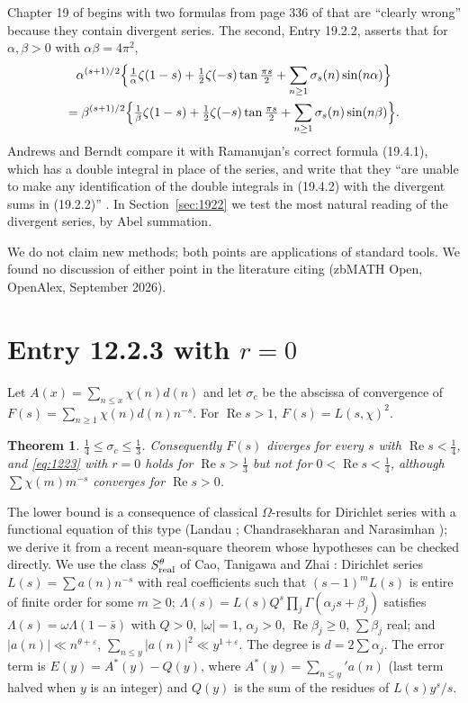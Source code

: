 \documentclass[11pt]{article}
\newtheorem{theorem}{Theorem}
\theoremstyle{remark}
\begin{document}
Chapter 19 of \cite{AB4} begins with two formulas from page 336 of \cite{LN} that are ``clearly wrong'' because they contain
divergent series. The second, Entry 19.2.2, asserts that for $\alpha,\beta>0$ with $\alpha\beta=4\pi^2$,
\begin{multline}\label{eq:1922}
\alpha^{(s+1)/2}\Bigl\{\tfrac1\alpha\zeta(1-s)+\tfrac12\zeta(-s)\tan\tfrac{\pi s}2+\sum_{n\ge1}\sigma_s(n)\sin(n\alpha)\Bigr\}\\
=\beta^{(s+1)/2}\Bigl\{\tfrac1\beta\zeta(1-s)+\tfrac12\zeta(-s)\tan\tfrac{\pi s}2+\sum_{n\ge1}\sigma_s(n)\sin(n\beta)\Bigr\}.
\end{multline}
Andrews and Berndt compare it with Ramanujan's correct formula (19.4.1), which has a double integral in place of the series, and
write that they ``are unable to make any identification of the double integrals in (19.4.2) with the divergent sums in (19.2.2)''
\cite[p.~380]{AB4}. In Section~\ref{sec:1922} we test the most natural reading of the divergent series, by Abel summation.

We do not claim new methods; both points are applications of standard tools. We found no discussion of either point in the
literature citing \cite{AB4} (zbMATH Open, OpenAlex, September 2026).

\section{Entry 12.2.3 with \texorpdfstring{$r=0$}{r=0}}\label{sec:1223}
Let $A(x)=\sum_{n\le x}\chi(n)d(n)$ and let $\sigma_c$ be the abscissa of convergence of $F(s)=\sum_{n\ge1}\chi(n)d(n)n^{-s}$.
For $\operatorname{Re}s>1$, $F(s)=L(s,\chi)^2$.

\begin{theorem}\label{thm:main}
$\tfrac14\le\sigma_c\le\tfrac13$. Consequently $F(s)$ diverges for every $s$ with $\operatorname{Re}s<\tfrac14$, and \eqref{eq:1223}
with $r=0$ holds for $\operatorname{Re}s>\tfrac13$ but not for $0<\operatorname{Re}s<\tfrac14$, although $\sum\chi(m)m^{-s}$ converges
for $\operatorname{Re}s>0$.
\end{theorem}

The lower bound is a consequence of classical $\Omega$-results for Dirichlet series with a functional equation of this
type (Landau \cite{La}; Chandrasekharan and Narasimhan \cite{CN}); we derive it from a recent mean-square theorem whose hypotheses
can be checked directly. We use the class $S^\theta_{\rm real}$ of Cao, Tanigawa and Zhai \cite{CTZ}: Dirichlet series $L(s)=\sum a(n)n^{-s}$ with real
coefficients such that $(s-1)^mL(s)$ is entire of finite order for some $m\ge0$; $\Lambda(s)=L(s)Q^s\prod_{j}\Gamma(\alpha_js+\beta_j)$
satisfies $\Lambda(s)=\omega\Lambda(1-\bar s)$ with $Q>0$, $|\omega|=1$, $\alpha_j>0$, $\operatorname{Re}\beta_j\ge0$, $\sum\beta_j$ real;
and $|a(n)|\ll n^{\theta+\varepsilon}$, $\sum_{n\le y}|a(n)|^2\ll y^{1+\varepsilon}$. The degree is $d=2\sum\alpha_j$. The error term is
$E(y)=A^*(y)-Q(y)$, where $A^*(y)=\sum_{n\le y}{}'a(n)$ (last term halved when $y$ is an integer) and $Q(y)$ is the sum of the residues
of $L(s)y^s/s$.
\end{document}
